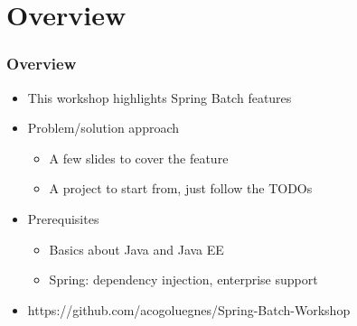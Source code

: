 \section{Overview}

\begin{frame}
\frametitle{Overview}
\begin{itemize}
	\item This workshop highlights Spring Batch features
	\item Problem/solution approach
	\begin{itemize}
		\item A few slides to cover the feature
		\item A project to start from, just follow the TODOs
	\end{itemize}
	\item Prerequisites
	\begin{itemize}
		\item Basics about Java and Java EE
		\item Spring: dependency injection, enterprise support
	\end{itemize}
	\item https://github.com/acogoluegnes/Spring-Batch-Workshop
\end{itemize}

\end{frame}
